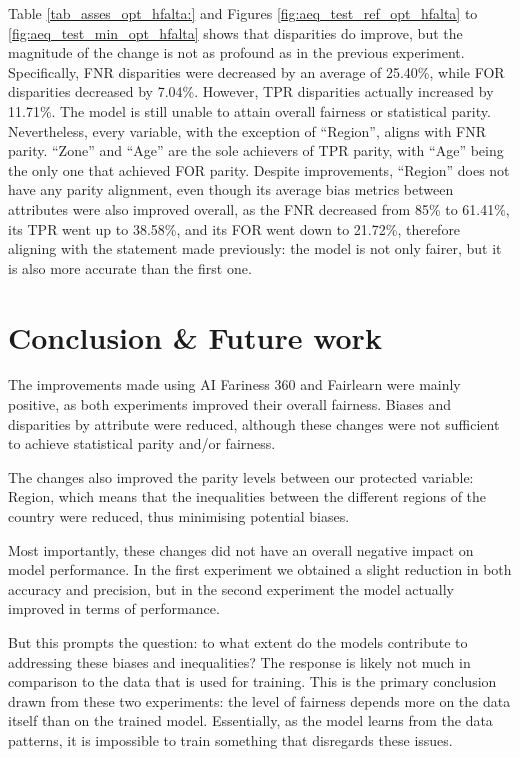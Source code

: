 \documentclass[twoside,11pt]{article}
\begin{document}
 Table \ref{tab_asses_opt_hfalta:} and Figures \ref{fig:aeq_test_ref_opt_hfalta} to \ref{fig:aeq_test_min_opt_hfalta} shows that disparities do improve, but the magnitude of the change is not as profound as in the previous experiment. Specifically, FNR disparities were decreased by an average of 25.40\%, while FOR disparities decreased by 7.04\%. However, TPR disparities actually increased by 11.71\%. The model is still unable to attain overall fairness or statistical parity. Nevertheless, every variable, with the exception of ``Region'', aligns with FNR parity. ``Zone'' and ``Age'' are the sole achievers of TPR parity, with ``Age'' being the only one that achieved FOR parity. Despite improvements, ``Region'' does not have any parity alignment, even though its average bias metrics between attributes were also improved overall, as the FNR decreased from 85\% to 61.41\%, its TPR went up to 38.58\%, and its FOR went down to 21.72\%, therefore aligning with the statement made previously: the model is not only fairer, but it is also more accurate than the first one.

\section{Conclusion \& Future work}
\label{conclusion}

The improvements made using AI Fariness 360 and Fairlearn were mainly positive, as both experiments improved their overall fairness. Biases and disparities by attribute were reduced, although these changes were not sufficient to achieve statistical parity and/or fairness.

The changes also improved the parity levels between our protected variable: Region, which means that the inequalities between the different regions of the country were reduced, thus minimising potential biases. 

Most importantly, these changes did not have an overall negative impact on model performance. In the first experiment we obtained a slight reduction in both accuracy and precision, but in the second experiment the model actually improved in terms of performance.

But this prompts the question: to what extent do the models contribute to addressing these biases and inequalities? The response is likely not much in comparison to the data that is used for training. This is the primary conclusion drawn from these two experiments: the level of fairness depends more on the data itself than on the trained model. Essentially, as the model learns from the data patterns, it is impossible to train something that disregards these issues.
\end{document}
